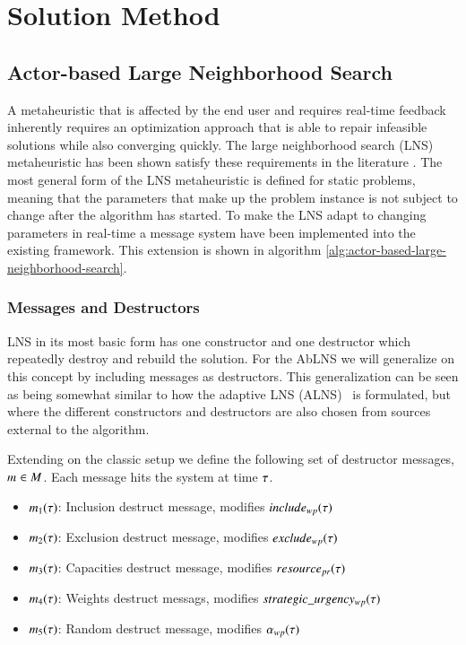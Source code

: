 \section{Solution Method}
\label{sec:2-solution-method}

\subsection{Actor-based Large Neighborhood Search}
A metaheuristic that is affected by the end user and requires real-time feedback
inherently requires an optimization approach that is able to repair infeasible solutions
while also converging quickly. The large neighborhood search (LNS)~\cite{shaw1998using}
metaheuristic has been shown satisfy these requirements in the literature
\cite{gendreauHandbookMetaheuristics2019}. The most general form of the LNS metaheuristic
is defined for static problems, meaning that the parameters that make up the problem instance
is not subject to change after the algorithm has started. To make the
LNS adapt to changing parameters in real-time a message system have been
implemented into the existing framework. This  extension is shown in algorithm
\ref{alg:actor-based-large-neighborhood-search}.

\subsubsection{Messages and Destructors}
LNS in its most basic form has one constructor and one destructor which
repeatedly destroy and rebuild the solution. For the AbLNS we will generalize
on this concept by including messages as destructors. This generalization can
be seen as being somewhat similar to how
the adaptive LNS (ALNS)~\cite{pisinger2007general} is formulated, but where the different constructors and
destructors are also chosen from sources external to the algorithm.

Extending on the classic setup we define the following set of 
destructor messages, $m_{}^{} \in M$. Each
message hits the system at time $\tau$.

\begin{itemize}
	\item $m_1(\tau)$: Inclusion destruct message, modifies $include_{wp}(\tau)$	
	\item $m_2(\tau)$: Exclusion destruct message, modifies $exclude_{wp}(\tau)$
	\item $m_3(\tau)$: Capacities destruct message, modifies $\ParStrategicResource$
	\item $m_4(\tau)$: Weights destruct messags, modifies $strategic\_urgency_{w p}(\tau)$
	\item $m_5(\tau)$: Random destruct message, modifies $\alpha_{wp}(\tau)$
\end{itemize}

